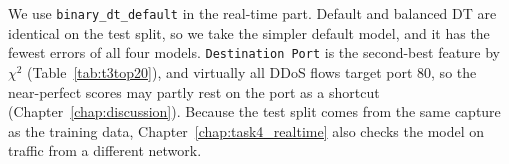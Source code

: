 We use \texttt{binary\_dt\_default} in the real-time part. Default and balanced DT are identical on the test split, so we take the simpler default model, and it has the fewest errors of all four models. \texttt{Destination Port} is the second-best feature by $\chi^2$ (Table~\ref{tab:t3top20}), and virtually all DDoS flows target port 80, so the near-perfect scores may partly rest on the port as a shortcut (Chapter~\ref{chap:discussion}). Because the test split comes from the same capture as the training data, Chapter~\ref{chap:task4_realtime} also checks the model on traffic from a different network.

\FloatBarrier
